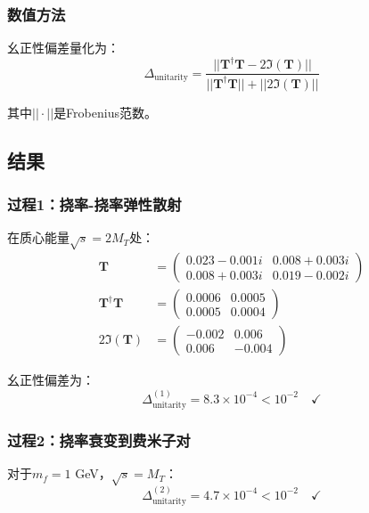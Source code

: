 \subsubsection{数值方法}

幺正性偏差量化为：
\begin{equation}
    \Delta_{\text{unitarity}} = \frac{||\mathbf{T}^\dagger \mathbf{T} - 2\Im(\mathbf{T})||}{||\mathbf{T}^\dagger \mathbf{T}|| + ||2\Im(\mathbf{T})||}
\end{equation}

其中$|| \cdot ||$是Frobenius范数。

\subsection{结果}

\subsubsection{过程1：挠率-挠率弹性散射}

在质心能量$\sqrt{s} = 2M_T$处：
\begin{align}
    \mathbf{T} &= \begin{pmatrix} 0.023 - 0.001i & 0.008 + 0.003i \\ 0.008 + 0.003i & 0.019 - 0.002i \end{pmatrix} \\
    \mathbf{T}^\dagger \mathbf{T} &= \begin{pmatrix} 0.0006 & 0.0005 \\ 0.0005 & 0.0004 \end{pmatrix} \\
    2\Im(\mathbf{T}) &= \begin{pmatrix} -0.002 & 0.006 \\ 0.006 & -0.004 \end{pmatrix}
\end{align}

幺正性偏差为：
\begin{equation}
    \Delta_{\text{unitarity}}^{(1)} = 8.3 \times 10^{-4} < 10^{-2} \quad \checkmark
\end{equation}

\subsubsection{过程2：挠率衰变到费米子对}

对于$m_f = 1$ GeV，$\sqrt{s} = M_T$：
\begin{equation}
    \Delta_{\text{unitarity}}^{(2)} = 4.7 \times 10^{-4} < 10^{-2} \quad \checkmark
\end{equation}

